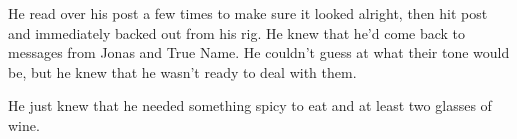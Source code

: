 He read over his post a few times to make sure it looked alright, then hit post and immediately backed out from his rig. He knew that he'd come back to messages from Jonas and True Name. He couldn't guess at what their tone would be, but he knew that he wasn't ready to deal with them.

He just knew that he needed something spicy to eat and at least two glasses of wine.
